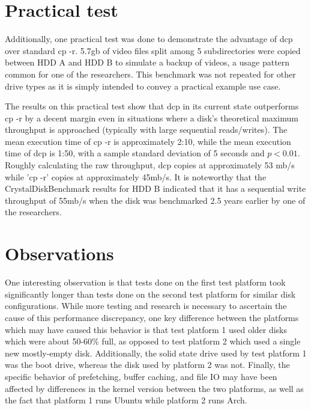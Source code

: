 \documentclass[12pt]{article}
\begin{document}
\section{Practical test}
Additionally, one practical test was done to demonstrate the advantage
of dcp over standard cp -r. 5.7gb of video files split among 5 subdirectories were copied between
HDD A and HDD B to simulate a backup of videos, a usage pattern common for one of the researchers.
This benchmark was not repeated for other drive types as it is simply intended to convey a practical example use
case.

The results on this practical test show that dcp in its current state outperforms cp -r by a decent margin even
in situations where a disk's theoretical maximum throughput is approached (typically with large sequential reads/writes).
The mean execution time of cp -r is approximately 2:10, while the mean execution time of dcp is 1:50, with a sample standard deviation of
5 seconds and $p < 0.01$. Roughly calculating the raw throughput, dcp copies at approximately 53 mb/s while 'cp -r' copies
at approximately 45mb/s. It is noteworthy that the CrystalDiskBenchmark results for HDD B indicated that it has a sequential
write throughput of 55mb/s when the disk was benchmarked 2.5 years earlier by one of the researchers.

\section{Observations}
One interesting observation is that tests done on the first test platform took significantly longer
than tests done on the second test platform for similar disk configurations. While more testing and
research is necessary to ascertain the cause of this performance discrepancy, one key difference between
the platforms which may have caused this behavior is that test platform 1 used older disks which were
about 50-60\% full, as opposed to test platform 2 which used a single new mostly-empty disk. Additionally,
the solid state drive used by test platform 1 was the boot drive, whereas the disk used by platform 2
was not. Finally, the specific behavior of prefetching, buffer caching, and file IO may have been affected by differences
in the kernel version between the two platforms, as well as the fact that platform 1 runs Ubuntu while platform 2 runs Arch.
\end{document}
